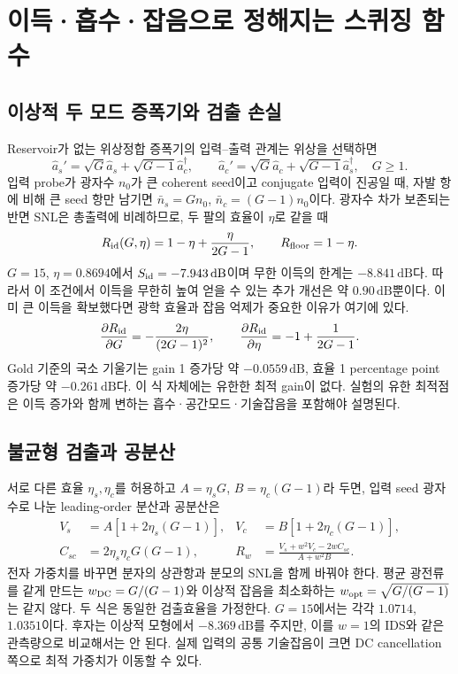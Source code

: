 \documentclass[11pt,a4paper]{article}
\newcommand{\dB}{\,\mathrm{dB}}
\begin{document}
\section{이득·흡수·잡음으로 정해지는 스퀴징 함수}
\subsection{이상적 두 모드 증폭기와 검출 손실}
Reservoir가 없는 위상정합 증폭기의 입력--출력 관계는 위상을 선택하면
\begin{equation}
 \hat a_s'=\sqrt G\hat a_s+\sqrt{G-1}\hat a_c^\dagger,\qquad
 \hat a_c'=\sqrt G\hat a_c+\sqrt{G-1}\hat a_s^\dagger,\quad G\geq1.
\end{equation}
입력 probe가 광자수 $n_0$가 큰 coherent seed이고 conjugate 입력이 진공일 때,
자발 항에 비해 큰 seed 항만 남기면 $\bar n_s=Gn_0$,
$\bar n_c=(G-1)n_0$이다. 광자수 차가 보존되는 반면 SNL은 총출력에
비례하므로, 두 팔의 효율이 $\eta$로 같을 때
\begin{equation}
 R_{\rm id}(G,\eta)=1-\eta+\frac{\eta}{2G-1},\qquad R_{\rm floor}=1-\eta.
 \label{eq:ideal}
\end{equation}
$G=15$, $\eta=0.8694$에서 $S_{\rm id}=-7.943\dB$이며 무한 이득의
한계는 $-8.841\dB$다. 따라서 이 조건에서 이득을 무한히 높여 얻을 수 있는
추가 개선은 약 $0.90\dB$뿐이다. 이미 큰 이득을 확보했다면 광학 효율과
잡음 억제가 중요한 이유가 여기에 있다.
\begin{equation}
 \frac{\partial R_{\rm id}}{\partial G}=-\frac{2\eta}{(2G-1)^2},\qquad
 \frac{\partial R_{\rm id}}{\partial\eta}=-1+\frac1{2G-1}.
\end{equation}
Gold 기준의 국소 기울기는 gain 1 증가당 약 $-0.0559\dB$,
효율 1 percentage point 증가당 약 $-0.261\dB$다. 이 식 자체에는
유한한 최적 gain이 없다. 실험의 유한 최적점은 이득 증가와 함께 변하는
흡수·공간모드·기술잡음을 포함해야 설명된다.

\subsection{불균형 검출과 공분산}
서로 다른 효율 $\eta_s,\eta_c$를 허용하고 $A=\eta_sG$,
$B=\eta_c(G-1)$라 두면, 입력 seed 광자수로 나눈 leading-order
분산과 공분산은
\begin{align}
 V_s&=A[1+2\eta_s(G-1)],&
 V_c&=B[1+2\eta_c(G-1)],\\
 C_{sc}&=2\eta_s\eta_cG(G-1),&
 R_w&=\frac{V_s+w^2V_c-2wC_{sc}}{A+w^2B}.
 \label{eq:weighted}
\end{align}
전자 가중치를 바꾸면 분자의 상관항과 분모의 SNL을 함께 바꿔야 한다.
평균 광전류를 같게 만드는 $w_{\rm DC}=G/(G-1)$와 이상적 잡음을
최소화하는 $w_{\rm opt}=\sqrt{G/(G-1)}$는 같지 않다. 두 식은 동일한
검출효율을 가정한다. $G=15$에서는 각각 $1.0714$, $1.0351$이다.
후자는 이상적 모형에서 $-8.369\dB$를 주지만, 이를 $w=1$의 IDS와 같은
관측량으로 비교해서는 안 된다. 실제 입력의 공통 기술잡음이 크면 DC
cancellation 쪽으로 최적 가중치가 이동할 수 있다.
\end{document}
